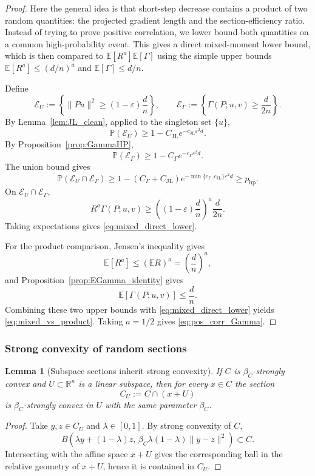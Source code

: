 \documentclass{article}
\newtheorem{lemma}{Lemma}
\begin{document}
\begin{proof}
Here the general idea is that
short-step decrease contains a product of two random quantities: the projected
gradient length and the section-efficiency ratio. Instead of trying to prove
positive correlation, we lower bound both quantities on a common
high-probability event. This gives a direct mixed-moment lower bound, which is
then compared to \(\mathbb E[R^a]\mathbb E[\Gamma]\) using the simple upper
bounds \(\mathbb E[R^a]\le(d/n)^a\) and \(\mathbb E[\Gamma]\le d/n\). 


Define
\[
\mathcal E_U
:=
\left\{
\|Pu\|^2\ge (1-\varepsilon)\frac dn
\right\},
\qquad
\mathcal E_\Gamma
:=
\left\{
\Gamma(P;u,v)\ge \frac{d}{2n}
\right\}.
\]
By Lemma~\ref{lem:JL_clean}, applied to the singleton set \(\{u\}\),
\[
\mathbb P(\mathcal E_U)
\ge
1-C_{\mathrm{JL}}e^{-c_{\mathrm{JL}}\varepsilon^2d}.
\]
By Proposition~\ref{prop:GammaHP},
\[
\mathbb P(\mathcal E_\Gamma)
\ge
1-C_{\Gamma}e^{-c_{\Gamma}\varepsilon^2d}.
\]
The union bound gives
\[
\mathbb P(\mathcal E_U\cap\mathcal E_\Gamma)
\ge
1-
(C_{\Gamma}+C_{\mathrm{JL}})
e^{-\min\{c_{\Gamma},c_{\mathrm{JL}}\}\varepsilon^2d}
\ge
p_{\mathrm{hp}}.
\]
On \(\mathcal E_U\cap\mathcal E_\Gamma\),
\[
R^a\Gamma(P;u,v)
\ge
\left((1-\varepsilon)\frac dn\right)^a
\frac{d}{2n}.
\]
Taking expectations gives \eqref{eq:mixed_direct_lower}.

For the product comparison, Jensen's inequality gives
\[
\mathbb E[R^a]
\le
(\mathbb E R)^a
=
\left(\frac dn\right)^a,
\]
and Proposition~\ref{prop:EGamma_identity} gives
\[
\mathbb E[\Gamma(P;u,v)]\le \frac dn.
\]
Combining these two upper bounds with \eqref{eq:mixed_direct_lower} yields
\eqref{eq:mixed_vs_product}. Taking \(a=1/2\) gives
\eqref{eq:pos_corr_Gamma}.
\end{proof}

\subsubsection{Strong convexity of random sections}

\begin{lemma}[Subspace sections inherit strong convexity]
\label{lem:subspace_SC}
If \(C\) is \(\beta_C\)-strongly convex and \(U\subset\mathbb R^n\) is a linear
subspace, then for every \(x\in C\) the section
\[
C_U:=C\cap(x+U)
\]
is \(\beta_C\)-strongly convex in \(U\) with the same parameter \(\beta_C\).
\end{lemma}

\begin{proof}
Take \(y,z\in C_U\) and \(\lambda\in[0,1]\). By strong convexity of \(C\),
\[
B(\lambda y+(1-\lambda)z,\,
\beta_C\lambda(1-\lambda)\|y-z\|^2)
\subset C.
\]
Intersecting with the affine space \(x+U\) gives the corresponding ball in the
relative geometry of \(x+U\), hence it is contained in \(C_U\).
\end{proof}
\end{document}

